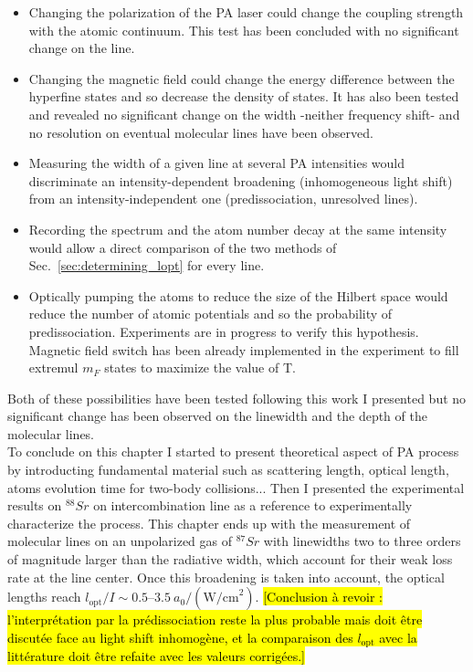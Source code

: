 \begin{itemize}
    \item Changing the polarization of the PA laser could change the coupling strength with the atomic continuum. This test has been concluded with no significant change on the line.
    \item Changing the magnetic field could change the energy difference between the hyperfine states and so decrease the density of states. It has also been tested and revealed no significant
    change on the width -neither frequency shift- and no resolution on eventual molecular lines have been observed.
    \item Measuring the width of a given line at several PA intensities would discriminate an intensity-dependent broadening (inhomogeneous light shift) from an intensity-independent one (predissociation, unresolved lines).
    \item Recording the spectrum and the atom number decay at the same intensity would allow a direct comparison of the two methods of Sec.~\ref{sec:determining_lopt} for every line.
    \item Optically pumping the atoms to reduce the size of the Hilbert space would reduce the number of atomic potentials and so the probability of predissociation. Experiments are 
    in progress to verify this hypothesis. Magnetic field switch has been already implemented in the experiment to fill extremul $m_F$ states to maximize the value of T.
\end{itemize}

Both of these possibilities have been tested following this work I presented
but no significant change has been observed on the linewidth and the depth of the molecular lines.\\
        

To conclude on this chapter I started to present theoretical aspect of PA process by introducting fundamental material such as scattering length, optical length, atoms evolution time for two-body collisions... 
Then I presented the experimental results on $^{88}Sr$ on intercombination line as a reference to experimentally characterize the process. This chapter ends up with the measurement of molecular lines on an 
unpolarized gas of $^{87}Sr$ with linewidths two to three orders of magnitude larger than the radiative width, which account for their weak loss rate at the line center. Once this broadening is taken into account, the optical lengths reach $l_{\text{opt}}/I \sim 0.5$--$3.5~a_0/(\text{W/cm}^2)$. \hl{[Conclusion à revoir : l'interprétation par la prédissociation reste la plus probable mais doit être discutée face au light shift inhomogène, et la comparaison des $l_{\text{opt}}$ avec la littérature doit être refaite avec les valeurs corrigées.]}\\

